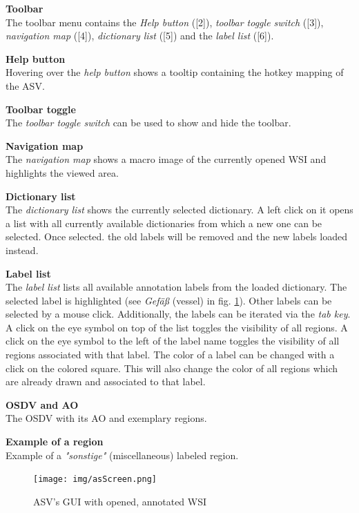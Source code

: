 \begin{enumerate}[{[}1{]}]
	\item \textbf{Toolbar}\\
	The toolbar menu contains the \emph{Help button} ([2]), \emph{toolbar toggle switch} ([3]), \emph{navigation map} ([4]), \emph{dictionary list} ([5]) and the \emph{label list} ([6]).
	\item \textbf{Help button}\\
	Hovering over the \emph{help button} shows a tooltip containing the hotkey mapping of the ASV.
	\item \textbf{Toolbar toggle}\\
	The \emph{toolbar toggle switch} can be used to show and hide the toolbar.
	\item \textbf{Navigation map}\\
	The \emph{navigation map} shows a macro image of the currently opened WSI and highlights the viewed area.
	\item \textbf{Dictionary list}\\
	The \emph{dictionary list} shows the currently selected dictionary. A left click on it opens a list with all currently available dictionaries from which a new one can be selected. Once selected. the old labels will be removed and the new labels loaded instead.
	\item \textbf{Label list}\\
	The \emph{label list} lists all available annotation labels from the loaded dictionary. The selected label is highlighted (see \emph{Gef\"a\ss} (vessel) in fig. \ref{fig4_asSCreen}). Other labels can be selected by a mouse click. Additionally, the labels can be iterated via the \emph{tab key}. A click on the eye symbol on top of the list toggles the visibility of all regions. A click on the eye symbol to the left of the label name toggles the visibility of all regions associated with that label. The color of a label can be changed with a click on the colored square. This will also change the color of all regions which are already drawn and associated to that label.
	\item \textbf{OSDV and AO}\\
	The OSDV with its AO and exemplary regions.
	\item \textbf{Example of a region}\\
	Example of a \emph{"sonstige"} (miscellaneous) labeled region.
	
\end{enumerate}

\begin{figure}[!h]
	\begin{center}
		\texttt{[image: img/asScreen.png]}
		\caption{ASV's GUI with opened, annotated WSI}
		\label{fig4_asSCreen}
	\end{center}
\end{figure}